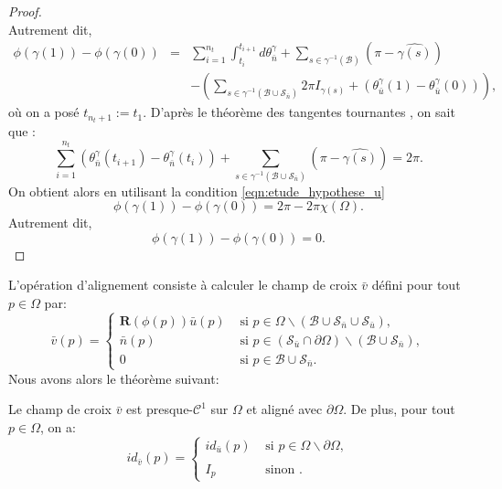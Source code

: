 \begin{proof}
$$    $$
    Autrement dit,
    $$
    \begin{array}{lcl}
        \phi(\gamma(1))-\phi(\gamma(0))&=&\displaystyle\sum_{i=1}^{n_t}\int_{t_i}^{t_{i+1}}d\theta_{\bar{n}}^\gamma+\sum_{s\in\gamma^{-1}(\mathcal{B})}\left(\pi-\widehat{\gamma(s)}\right)\\[0.7cm]
        &&-\displaystyle\left(\sum_{s\in\gamma^{-1}(\mathcal{B}\cup\mathcal{S}_{\bar{n}})}2\pi I_{\gamma(s)}+(\theta_{\bar{u}}^\gamma(1)-\theta_{\bar{u}}^\gamma(0))\right),
    \end{array}
    $$
    où on a posé $t_{n_t+1}:=t_1$. D'après le théorème des tangentes tournantes \cite{hopf1935drehung, rotskoff2010gauss}, on sait que :
    $$
    \displaystyle\sum_{i=1}^{n_t}\left(\theta_{\bar{n}}^\gamma(t_{i+1})-\theta_{\bar{n}}^\gamma(t_i)\right)+\sum_{s\in\gamma^{-1}(\mathcal{B}\cup\mathcal{S}_{\bar{n}})}\left(\pi-\widehat{\gamma(s)}\right)=2\pi.
    $$
    On obtient alors en utilisant la condition \eqref{eqn:etude_hypothese_u}
    $$
    \phi(\gamma(1))-\phi(\gamma(0))=2\pi-2\pi\chi(\Omega).
    $$
    Autrement dit,
    $$
    \phi(\gamma(1))-\phi(\gamma(0))=0.
    $$
\end{proof}
L'opération d'alignement consiste à calculer le champ de croix $\bar{v}$ défini pour tout $p\in\Omega$ par:
\begin{equation}
\bar{v}(p)=
\left\{
\begin{array}{ll}
\mathbf{R}(\phi(p))\bar{u}(p) & \mbox{ si } p\in\Omega\backslash(\mathcal{B}\cup\mathcal{S}_{\bar{n}}\cup\mathcal{S}_{\bar{u}}),\\[0.5cm]
\bar{n}(p) & \mbox{ si } p\in(\mathcal{S}_{\bar{u}}\cap\partial\Omega)\backslash(\mathcal{B}\cup\mathcal{S}_{\bar{n}}),\\[0.5cm]
0 & \mbox{ si } p\in\mathcal{B}\cup\mathcal{S}_{\bar{n}}.
\end{array}
\right.
\label{eqn:etude_def_v}
\end{equation}
Nous avons alors le théorème suivant:
\begin{theorem}
\label{thm:theorem2}
Le champ de croix $\bar{v}$ est presque-$\mathcal{C}^1$ sur $\Omega$ et aligné avec $\partial\Omega$. De plus, pour tout $p\in\Omega$, on a:
\begin{equation}
id_{\bar{v}}(p)=
\left\{
\begin{array}{ll}
    id_{\bar{u}}(p) & \mbox{ si } p\in\Omega\backslash\partial\Omega,\\\\
    I_p & \mbox{ sinon }.
\end{array}
\right.
\end{equation}
\end{theorem}

